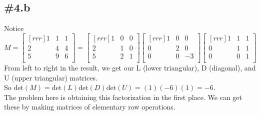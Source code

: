 \documentclass{report}
\begin{document}
\subsection{\#4.b}
Notice
\[ M = \begin{bmatrix}[rrr]1&1&1\\2&4&4\\5&9&6\\\end{bmatrix}=\begin{bmatrix}[rrr]1&0&0\\2&1&0\\5&2&1\\\end{bmatrix}\begin{bmatrix}[rrr]1&0&0\\0&2&0\\0&0&-3\\\end{bmatrix}\begin{bmatrix}[rrr]1&1&1\\0&1&1\\0&0&1\\\end{bmatrix} \]
From left to right in the result, we get our L (lower triangular), D (diagonal), and U (upper triangular) matrices.\\
So $\mathrm{det}(M)=\mathrm{det}(L)\mathrm{det}(D)\mathrm{det}(U) = (1)(-6)(1) = -6$.\\
The problem here is obtaining this factorization in the first place. We can get these by making matrices of elementary row operations.
\end{document}
